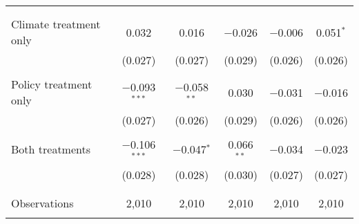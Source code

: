 \begin{tabular}{@{\extracolsep{5pt}}lccccc}
  &  &  &  &  &  \\ 
  & & & & & \\ 
 Climate treatment only & 0.032 & 0.016 & $-$0.026 & $-$0.006 & 0.051$^{*}$ \\ 
  & (0.027) & (0.027) & (0.029) & (0.026) & (0.026) \\ 
  & & & & & \\ 
 Policy treatment only & $-$0.093$^{***}$ & $-$0.058$^{**}$ & 0.030 & $-$0.031 & $-$0.016 \\ 
  & (0.027) & (0.026) & (0.029) & (0.026) & (0.026) \\ 
  & & & & & \\ 
 Both treatments & $-$0.106$^{***}$ & $-$0.047$^{*}$ & 0.066$^{**}$ & $-$0.034 & $-$0.023 \\ 
  & (0.028) & (0.028) & (0.030) & (0.027) & (0.027) \\ 
  & & & & & \\ 
\hline \\[-1.8ex] 

Observations & 2,010 & 2,010 & 2,010 & 2,010 & 2,010 \\ 
\hline 
\hline \\[-1.8ex] 
\end{tabular} 